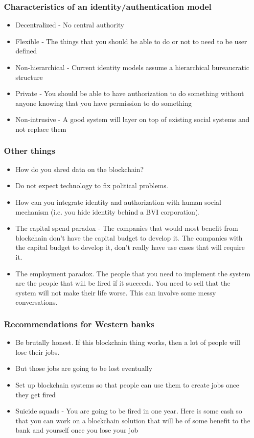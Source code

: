 \documentclass{beamer}
\begin{document}
\begin{frame}
  \frametitle{Characteristics of an identity/authentication model}
  \begin{itemize}
  \item Decentralized - No central authority
    \item Flexible - The things that you should be able to do or not
      to need to be user defined
    \item Non-hierarchical - Current identity models assume a
      hierarchical bureaucratic structure
    \item Private - You should be able to have authorization to do
      something without anyone knowing that you have permission to do
      something
    \item Non-intrusive - A good system will layer on top of existing
      social systems and not replace them
  \end{itemize}
\end{frame}
\begin{frame}
  \frametitle{Other things}
  \begin{itemize}
  \item How do you shred data on the blockchain?
  \item Do not expect technology to fix political problems.
  \item How can you integrate identity and authorization with human
    social mechanism (i.e. you hide identity behind a BVI
    corporation).
  \item The capital spend paradox - The companies that would most
    benefit from blockchain don't have the capital budget to develop
    it.  The companies with the capital budget to develop it, don't
    really have use cases that will require it.
  \item The employment paradox.  The people that you need to implement
    the system are the people that will be fired if it succeeds.  You
    need to sell that the system will not make their life worse.  This
    can involve some messy conversations.
  \end{itemize}
\end{frame}
\begin{frame}
  \frametitle{Recommendations for Western banks}
  \begin{itemize}
    \item Be brutally honest.  If this blockchain thing works, then a
      lot of people will lose their jobs.
    \item But those jobs are going to be lost eventually
    \item Set up blockchain systems so that people can use them to
      create jobs once they get fired
    \item Suicide squads - You are going to be fired in one year.
      Here is some cash so that you can work on a blockchain solution
      that will be of some benefit to the bank and yourself once you
      lose your job
  \end{itemize}
\end{frame}
\end{document}

